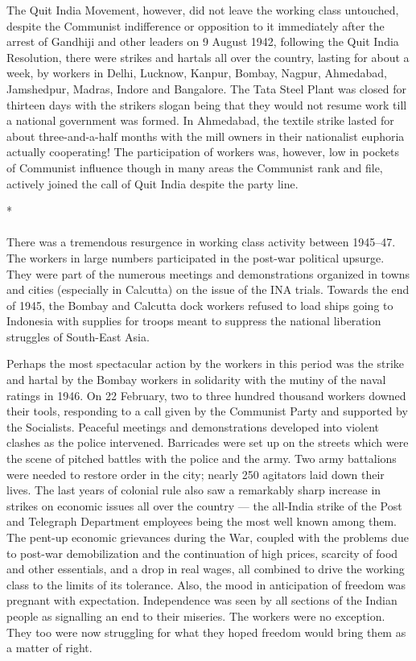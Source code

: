 \begin{multicols}{2}
The Quit India Movement, however, did not leave the working class untouched, despite the Communist indifference or opposition to it immediately after the arrest of Gandhiji and other leaders on 9 August 1942, following the Quit India Resolution, there were strikes and hartals all over the country, lasting for about a week, by workers in Delhi, Lucknow, Kanpur, Bombay, Nagpur, Ahmedabad, Jamshedpur, Madras, Indore and Bangalore. The Tata Steel Plant was closed for thirteen days with the strikers slogan being that they would not resume work till a national government was formed. In Ahmedabad, the textile strike lasted for about three-and-a-half months with the mill owners in their nationalist euphoria actually cooperating! The participation of workers was, however, low in pockets of Communist influence though in many areas the Communist rank and file, actively joined the call of Quit India despite the party line.

\begin{center}*\end{center}

\paragraph*{}
There was a tremendous resurgence in working class activity between 1945--47. The workers in large numbers participated in the post-war political upsurge. They were part of the numerous meetings and demonstrations organized in towns and cities (especially in Calcutta) on the issue of the INA trials. Towards the end of 1945, the Bombay and Calcutta dock workers refused to load ships going to Indonesia with supplies for troops meant to suppress the national liberation struggles of South-East Asia.

Perhaps the most spectacular action by the workers in this period was the strike and hartal by the Bombay workers in solidarity with the mutiny of the naval ratings in 1946. On 22 February, two to three hundred thousand workers downed their tools, responding to a call given by the Communist Party and supported by the Socialists. Peaceful meetings and demonstrations developed into violent clashes as the police intervened. Barricades were set up on the streets which were the scene of pitched battles with the police and the army. Two army battalions were needed to restore order in the city; nearly 250 agitators laid down their lives. The last years of colonial rule also saw a remarkably sharp increase in strikes on economic issues all over the country --- the all-India strike of the Post and Telegraph Department employees being the most well known among them. The pent-up economic grievances during the War, coupled with the problems due to post-war demobilization and the continuation of high prices, scarcity of food and other essentials, and a drop in real wages, all combined to drive the working class to the limits of its tolerance. Also, the mood in anticipation of freedom was pregnant with expectation. Independence was seen by all sections of the Indian people as signalling an end to their miseries. The workers were no exception. They too were now struggling for what they hoped freedom would bring them as a matter of right.

\end{multicols}
